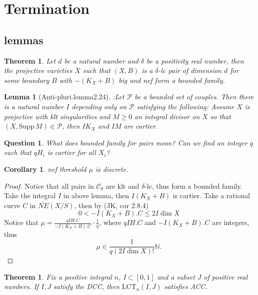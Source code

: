 \documentclass{article}
\newtheorem{lem}[defn]{Lemma}
\newtheorem{thm}[defn]{Theorem}
\newtheorem{cor}[defn]{Corollary}
\newtheorem*{ques}{Question}
\begin{document}
\section{Termination}

\subsection{lemmas}
\begin{thm}
		Let $ d $ be a natural number and $ \delta $ be a positivity real number, then the projective varieties $ X $ such that $ (X,B) $ is a $ \delta $-lc pair of dimension $ d $ for some boundary $ B $ with $ -(K_X+B) $ big  and nef form a bounded family.
\end{thm}
\begin{lem}
	[Anti-pluri.lemma2.24]:Let $ \mathcal{P} $ be  a bounded set of couples. Then there is  a natural number $ I $ depending only on $ \mathcal{P} $ satisfying the following: Assume $ X $ is projective with klt singularities and $ M\geqslant 0 $ an integral divisor on $ X $ so that $ (X,\mathrm{Supp}\, M)\in \mathcal{P} $, then $ IK_X $ and $ IM $ are cartier.
\end{lem}
\begin{ques}
	What does bounded family for pairs mean? Can we find an integer $ q $ such that $ qH_i $ is cartier for all $  X_i  $?
\end{ques}


	
\begin{cor}
		nef threshold $ \mu $ is discrete.	
\end{cor}
	\begin{proof}
		Notice that all pairs in $ \mathcal{C}_\theta $ are klt and $ \delta $-lc, thus form a bounded family. Take the integral $ I $ in above lemma, then $ I(K_X+B) $ is cartier. Take a rational curve $ C $ in $ \overline{NE}(X/S) $, then by (JK, cor 2.8.4)
		$$ 0<-I(K_X+B).C\leqslant 2I\dim X $$
		Notice that $ \mu=\frac{qIH.C}{-I(K_X+B).C}\cdot \frac{1}{q} $, where $ qIH.C $ and $ -I(K_X+B).C $ are integers, thus 
		$$ \mu\in \frac{1}{q(2I\dim X)!}\mathbb{N}.  $$
	\end{proof}

\begin{thm}
		Fix a positive integral $ n $, $ I\subset [0,1] $ and a subset $ J $ of positive real numbers. If $ I,J $ satisfy the DCC, then $ \mathrm{LCT}_n(I,J) $ satisfies ACC.
\end{thm}
\end{document}
